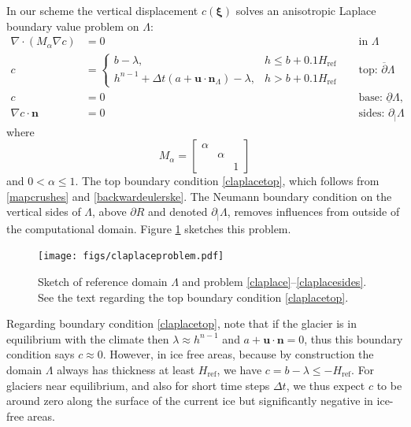 \documentclass[letterpaper,final,12pt,reqno]{amsart}
\newcommand{\grad}{\nabla}
\newcommand{\Div}{\nabla\cdot}
\newcommand{\bn}{\mathbf{n}}
\newcommand{\bu}{\mathbf{u}}
\newcommand{\bxi}{\bm{\xi}}
\newcommand{\Href}{H_{\text{ref}}}
\begin{document}
In our scheme the vertical displacement $c(\bxi)$ solves an anisotropic Laplace boundary value problem on $\Lambda$:
\begin{align}
        \Div(M_\alpha \grad c) &= 0 &&\text{in } \Lambda \label{claplace} \\
                c &= \begin{cases} b-\lambda, & h \le b + 0.1\Href \\
                                   h^{n-1} + \Delta t\left(a + \bu \cdot \bn_\Lambda\right) - \lambda, & h>b+0.1\Href \end{cases} &&\text{top: } \overline{\partial} \Lambda  \label{claplacetop} \\
                c &= 0 &&\text{base: } \underline{\partial} \Lambda,  \label{claplacebase} \\
 \grad c\cdot \bn &= 0 &&\text{sides: } \partial_{|} \Lambda  \label{claplacesides}
\end{align}
where
    $$M_\alpha = \begin{bmatrix} \alpha & & \\ & \alpha & \\ & & 1 \end{bmatrix}$$
and $0<\alpha\le 1$.  The top boundary condition \eqref{claplacetop}, which follows from \eqref{mapcrushes} and \eqref{backwardeulerske}.  The Neumann boundary condition on the vertical sides of $\Lambda$, above $\partial R$ and denoted $\partial_{|} \Lambda$, removes influences from outside of the computational domain.  Figure \ref{fig:claplaceproblem} sketches this problem.

\begin{figure}[ht]
\begin{center}
\texttt{[image: figs/claplaceproblem.pdf]}
\end{center}
\caption{Sketch of reference domain $\Lambda$ and problem \eqref{claplace}--\eqref{claplacesides}.  See the text regarding the top boundary condition \eqref{claplacetop}.}
\label{fig:claplaceproblem}
\end{figure}

Regarding boundary condition \eqref{claplacetop}, note that if the glacier is in equilibrium with the climate then $\lambda \approx h^{n-1}$ and $a+\bu\cdot\bn=0$, thus this boundary condition says $c\approx 0$.  However, in ice free areas, because by construction the domain $\Lambda$ always has thickness at least $\Href$, we have $c=b-\lambda \le -\Href$.  For glaciers near equilibrium, and also for short time steps $\Delta t$, we thus expect $c$ to be around zero along the surface of the current ice but significantly negative in ice-free areas.
\end{document}
